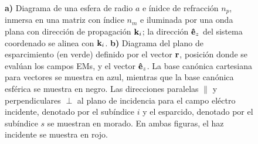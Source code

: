 \documentclass[letterpaper,11pt] {article}
\begin{document}
\begin{figure}[b!]
\begin{subfigure}{.45\linewidth}
%
\end{subfigure}
		\caption{ \textbf{a)} Diagrama de una esfera de radio $a$ e ínidce de refracción $n_p$, inmersa en una matriz con índice $n_m$ e iluminada por una onda plana con dirección de propagación $\vb{k}_i$; la dirección $\vu{e}_z$ del sistema coordenado se alinea con $\vb{k}_i$.   \textbf{b)} Diagrama del plano de esparcimiento (en verde) definido por el vector $\vb{r}$, posición donde se evalúan los campos EMs, y el vector $\vu{e}_z$.  La base canónica cartesiana para vectores se muestra en azul, mientras que la base canónica esférica se muestra en negro.  Las direcciones paralelas $\parallel$ y perpendiculares $\perp$ al plano de incidencia  para el campo eléctro incidente, denotado por el subíndice $i$ y el esparcido, denotado por el subíndice $s$ se muestran en morado.  En ambas figuras, el haz incidente se muestra en rojo. }\label{fig:Mie}
	\end{figure} 
	
\end{document}
